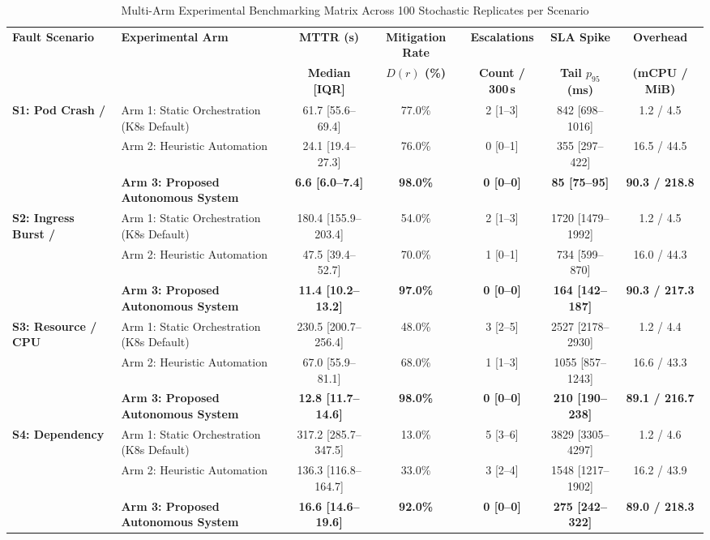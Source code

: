 \begin{table}[t]
\caption{Multi-Arm Experimental Benchmarking Matrix Across 100 Stochastic Replicates per Scenario}
\label{tab:multi_arm_benchmark}
\centering
\small
\setlength{\tabcolsep}{4.5pt}
\renewcommand{\arraystretch}{1.2}
\begin{tabular}{llccccc}
\hline
\textbf{Fault Scenario} & \textbf{Experimental Arm} & \textbf{MTTR (s)} & \textbf{Mitigation Rate} & \textbf{Escalations} & \textbf{SLA Spike} & \textbf{Overhead} \\
 & & \textbf{Median [IQR]} & \textbf{$D(r)$ (\%)} & \textbf{Count / 300\,s} & \textbf{Tail $p_{95}$ (ms)} & \textbf{(mCPU / MiB)} \\
\hline
\multirow{3}{*}{\textbf{S1: Pod Crash /}} & Arm 1: Static Orchestration (K8s Default) & 61.7 [55.6--69.4] & 77.0\% & 2 [1--3] & 842 [698--1016] & 1.2 / 4.5 \\
 & Arm 2: Heuristic Automation & 24.1 [19.4--27.3] & 76.0\% & 0 [0--1] & 355 [297--422] & 16.5 / 44.5 \\
\textbf{Container Failure} & \textbf{Arm 3: Proposed Autonomous System} & \textbf{6.6 [6.0--7.4]} & \textbf{98.0\%} & \textbf{0 [0--0]} & \textbf{85 [75--95]} & \textbf{90.3 / 218.8} \\
\hline
\multirow{3}{*}{\textbf{S2: Ingress Burst /}} & Arm 1: Static Orchestration (K8s Default) & 180.4 [155.9--203.4] & 54.0\% & 2 [1--3] & 1720 [1479--1992] & 1.2 / 4.5 \\
 & Arm 2: Heuristic Automation & 47.5 [39.4--52.7] & 70.0\% & 1 [0--1] & 734 [599--870] & 16.0 / 44.3 \\
\textbf{Traffic Surge} & \textbf{Arm 3: Proposed Autonomous System} & \textbf{11.4 [10.2--13.2]} & \textbf{97.0\%} & \textbf{0 [0--0]} & \textbf{164 [142--187]} & \textbf{90.3 / 217.3} \\
\hline
\multirow{3}{*}{\textbf{S3: Resource / CPU}} & Arm 1: Static Orchestration (K8s Default) & 230.5 [200.7--256.4] & 48.0\% & 3 [2--5] & 2527 [2178--2930] & 1.2 / 4.4 \\
 & Arm 2: Heuristic Automation & 67.0 [55.9--81.1] & 68.0\% & 1 [1--3] & 1055 [857--1243] & 16.6 / 43.3 \\
\textbf{Contention Saturation} & \textbf{Arm 3: Proposed Autonomous System} & \textbf{12.8 [11.7--14.6]} & \textbf{98.0\%} & \textbf{0 [0--0]} & \textbf{210 [190--238]} & \textbf{89.1 / 216.7} \\
\hline
\multirow{3}{*}{\textbf{S4: Dependency}} & Arm 1: Static Orchestration (K8s Default) & 317.2 [285.7--347.5] & 13.0\% & 5 [3--6] & 3829 [3305--4297] & 1.2 / 4.6 \\
 & Arm 2: Heuristic Automation & 136.3 [116.8--164.7] & 33.0\% & 3 [2--4] & 1548 [1217--1902] & 16.2 / 43.9 \\
\textbf{Disconnection / Lock} & \textbf{Arm 3: Proposed Autonomous System} & \textbf{16.6 [14.6--19.6]} & \textbf{92.0\%} & \textbf{0 [0--0]} & \textbf{275 [242--322]} & \textbf{89.0 / 218.3} \\
\hline
\end{tabular}
\end{table}